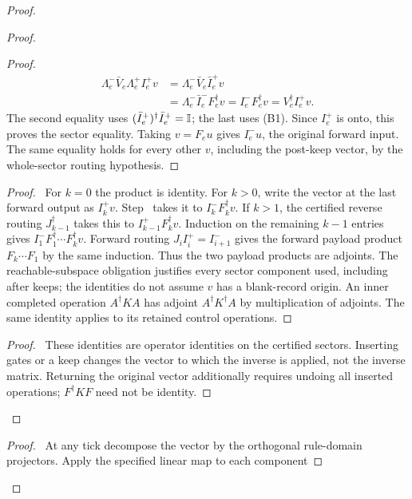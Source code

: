 \begin{proof}
\begin{proof}
\begin{proof}
  \[
  \begin{split}
   \Lambda_e^-\bar V_e\Lambda_e^+ I_e^+v
    &=\Lambda_e^-\bar V_e\bar I_e^+v\\
    &=\Lambda_e^-\bar I_e^-F_e^\dagger v
      =I_e^-F_e^\dagger v=V_e^\dagger I_e^+v.
  \end{split}
  \]
  The second equality uses
  $(\bar I_e^+)^\dagger\bar I_e^+=\mathbb{I}$; the last uses (B1).
  Since $I_e^+$ is onto, this proves the sector equality. Taking
  $v=F_eu$ gives $I_e^-u$, the original forward input. The same
  equality holds for every other $v$, including the post-keep vector,
  by the whole-sector routing hypothesis.\end{proof}
  \begin{proof}\pf\ For $k=0$ the product is identity. For $k>0$,
  write the vector at the last forward output as $I_k^+v$.
  Step~ takes it to
  $I_k^-F_k^\dagger v$. If $k>1$, the certified reverse routing
  $J_{k-1}^\dagger$ takes this to $I_{k-1}^+F_k^\dagger v$.
  Induction on the remaining $k-1$ entries gives
  $I_1^-F_1^\dagger\cdots F_k^\dagger v$.
  Forward routing $J_i I_i^+=I_{i+1}^-$ gives the forward payload
  product $F_k\cdots F_1$ by the same induction. Thus the two
  payload products are adjoints. The reachable-subspace obligation
  justifies every sector component used, including after keeps;
  the identities do not assume $v$ has a blank-record origin.
  An inner completed operation $A^\dagger K A$ has adjoint
  $A^\dagger K^\dagger A$ by multiplication of adjoints. The same
  identity applies to its retained control operations.\end{proof}
  \qedstep
  \begin{proof}\pf\ These identities are operator identities on the
  certified sectors. Inserting gates or a keep changes the vector to
  which the inverse is applied, not the inverse matrix. Returning the
  original vector additionally requires undoing all inserted operations;
  $F^\dagger K F$ need not be identity.\end{proof}
 \end{proof}
 \begin{proof}\pf\ At any tick decompose the vector by the orthogonal
 rule-domain projectors. Apply the specified linear map to each component

\end{proof}
\end{proof}
